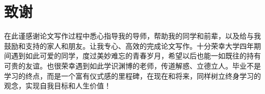 
\chapter{致谢}
在此谨感谢论文写作过程中悉心指导我的导师，帮助我的同学和前辈，以及给与我鼓励和支持的家人和朋友。让我专心、高效的完成论文写作。十分荣幸大学四年期间遇到如此可爱的同学，度过美妙难忘的青春岁月，希望以后也能一如既往的持有可贵的友谊。也很荣幸遇到如此学识渊博的老师，传道解惑、立德立人。毕业不是学习的终点，而是一个富有仪式感的里程碑，在现在和将来，同样树立终身学习的观念，实现自我目标和人生价值！
